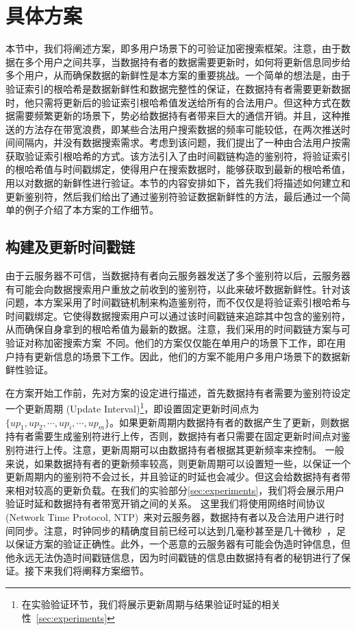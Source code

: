 \section{具体方案}
本节中，我们将阐述\multi 方案，即多用户场景下的可验证加密搜索框架。注意，由于数据在多个用户之间共享，当数据持有者的数据需要更新时，如何将更新信息同步给多个用户，从而确保数据的新鲜性是本方案的重要挑战。一个简单的想法是，由于验证索引的根哈希是数据新鲜性和数据完整性的保证，在数据持有者需要更新数据时，他只需将更新后的验证索引根哈希值发送给所有的合法用户。但这种方式在数据需要频繁更新的场景下，势必给数据持有者带来巨大的通信开销。并且，这种推送的方法存在带宽浪费，即某些合法用户搜索数据的频率可能较低，在两次推送时间间隔内，并没有数据搜索需求。考虑到该问题，我们提出了一种由合法用户按需获取验证索引根哈希的方式。该方法引入了由时间戳链构造的鉴别符，将验证索引的根哈希值与时间戳绑定，使得用户在搜索数据时，能够获取到最新的根哈希值，用以对数据的新鲜性进行验证。本节的内容安排如下，首先我们将描述如何建立和更新鉴别符，然后我们给出了通过鉴别符验证数据新鲜性的方法，最后通过一个简单的例子介绍了本方案的工作细节。

\subsection{构建及更新时间戳链}
由于云服务器不可信，当数据持有者向云服务器发送了多个鉴别符以后，云服务器有可能会向数据搜索用户重放之前收到的鉴别符，以此来破坏数据新鲜性。针对该问题，本方案采用了时间戳链机制来构造鉴别符，而不仅仅是将验证索引根哈希与时间戳绑定。它使得数据搜索用户可以通过该时间戳链来追踪其中包含的鉴别符，从而确保自身拿到的根哈希值为最新的数据。注意，我们采用的时间戳链方案与可验证对称加密搜索方案~\cite{stefanov2014practical}不同。他们的方案仅仅能在单用户的场景下工作，即在用户持有更新信息的场景下工作。因此，他们的方案不能用户多用户场景下的数据新鲜性验证。



在方案开始工作前，先对方案的设定进行描述，首先数据持有者需要为鉴别符设定一个更新周期 (Update Interval)\footnote{在实验验证环节，我们将展示更新周期与结果验证时延的相关性~\ref{sec:experiments}}，即设置固定更新时间点为$\{up_1, up_2, \cdots, up_i, \cdots, up_m\}$。如果更新周期内数据持有者的数据产生了更新，则数据持有者需要生成鉴别符进行上传，否则，数据持有者只需要在固定更新时间点对鉴别符进行上传。注意，更新周期可以由数据持有者根据其更新频率来控制。 一般来说，如果数据持有者的更新频率较高，则更新周期可以设置短一些，以保证一个更新周期内的鉴别符不会过长，并且验证的时延也会减少。但这会给数据持有者带来相对较高的更新负载。在我们的实验部分\ref{sec:experiments}，我们将会展示用户验证时延和数据持有者带宽开销之间的关系。
这里我们将使用网络时间协议 (Network Time Protocol, NTP)~\cite{mills1991internet, mills2010network}来对云服务器，数据持有者以及合法用户进行时间同步。注意，时钟同步的精确度目前已经可以达到几毫秒甚至是几十微秒~\cite{kopetz1987clock, elson2002fine, zhou2007accurate}，足以保证\multi 方案的验证正确性。此外，一个恶意的云服务器有可能会伪造时钟信息，但他永远无法伪造时间戳链信息，因为时间戳链的信息由数据持有者的秘钥进行了保证。接下来我们将阐释方案细节。


